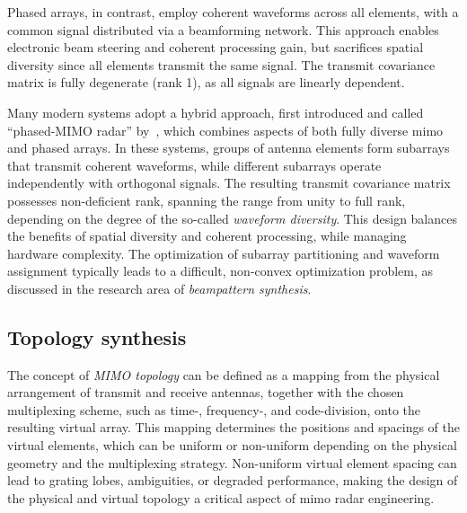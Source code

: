 Phased arrays, in contrast, employ coherent waveforms across all elements, with a common signal distributed via a beamforming network.
This approach enables electronic beam steering and coherent processing gain, but sacrifices spatial diversity since all elements transmit the same signal.
The transmit covariance matrix is fully degenerate (rank 1), as all signals are linearly dependent.

Many modern systems adopt a hybrid approach, first introduced and called \enquote{phased-MIMO radar} by~\textcite{hassanienPhasedMIMORadarTradeoff2010}, which combines aspects of both fully diverse \gls{mimo} and phased arrays.
In these systems, groups of antenna elements form subarrays that transmit coherent waveforms, while different subarrays operate independently with orthogonal signals.
The resulting transmit covariance matrix possesses non-deficient rank, spanning the range from unity to full rank, depending on the degree of the so-called \emph{waveform diversity}.
This design balances the benefits of spatial diversity and coherent processing, while managing hardware complexity.
The optimization of subarray partitioning and waveform assignment typically leads to a difficult, non-convex optimization problem, as discussed in the research area of \emph{beampattern synthesis}.


\subsection{Topology synthesis}

The concept of \emph{MIMO topology} can be defined as a mapping from the physical arrangement of transmit and receive antennas, together with the chosen multiplexing scheme, such as time-, frequency-, and code-division, onto the resulting virtual array.
This mapping determines the positions and spacings of the virtual elements, which can be uniform or non-uniform depending on the physical geometry and the multiplexing strategy.
Non-uniform virtual element spacing can lead to grating lobes, ambiguities, or degraded performance, making the design of the physical and virtual topology a critical aspect of \gls{mimo} radar engineering.

